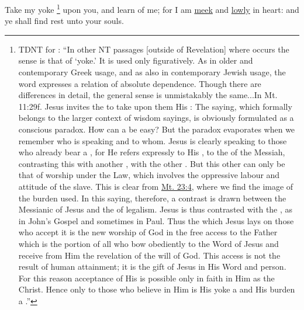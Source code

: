 			Take my yoke%
				\footnote{%
					TDNT for : ``In other NT passages [outside of Revelation] where  occurs the sense is that of `yoke.' It is used only figuratively. As in older and contemporary Greek usage, and as also in contemporary Jewish usage, the word expresses a relation of absolute dependence. Though there are differences in detail, the general sense is unmistakably the same...In Mt. 11:29f. Jesus invites the  to take upon them His :  The saying, which formally belongs to the larger context of wisdom sayings, is obviously formulated as a conscious paradox. How can a  be easy? But the paradox evaporates when we remember who is speaking and to whom. Jesus is clearly speaking to those who already bear a , for He refers expressly to His \gr{ζυγός}, to the  of the Messiah, contrasting this with another \gr{ζυγός}, with the other . But this other  can only be that of worship under the Law, which involves the oppressive labour and attitude of the slave. This is clear from \hyperref[MATTHEW-23-4]{Mt. 23:4}, where we find the image of the burden used. In this saying, therefore, a contrast is drawn between the Messianic \gr{ζυγός} of Jesus and the  of legalism. Jesus is thus contrasted with the , as in John's Gospel and sometimes in Paul. Thus the  which Jesus lays on those who accept it is the new worship of God in the free access to the Father which is the portion of all who bow obediently to the Word of Jesus and receive from Him the revelation of the will of God. This access is not the result of human attainment; it is the gift of Jesus in His Word and person. For this reason acceptance of His  is possible only in faith in Him as the Christ. Hence only to those who believe in Him is His yoke a  and His burden a .''
					}
			upon you, and learn of me; for I am \hyperref[MEEKNESS]{meek} and \hyperref[LOWLINESS]{lowly} in heart: and ye shall find rest unto your souls.

